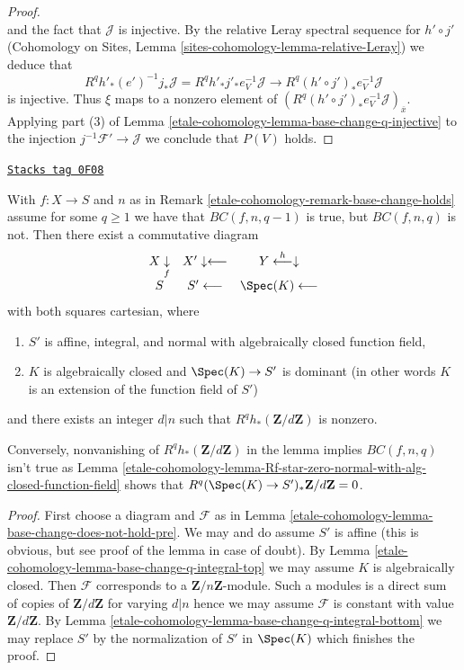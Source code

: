 \begin{proof}
$$$$
and the fact that $\mathcal{J}$ is injective.
By the relative Leray spectral sequence for $h' \circ j'$
(Cohomology on Sites, Lemma \ref{sites-cohomology-lemma-relative-Leray})
we deduce that
$$
R^qh'_*(e')^{-1}j_*\mathcal{J} =
R^qh'_*j'_*e_V^{-1}\mathcal{J}
\longrightarrow
R^q(h' \circ j')_* e_V^{-1}\mathcal{J}
$$
is injective. Thus $\xi$ maps to a nonzero element of
$(R^q(h' \circ j')_* e_V^{-1}\mathcal{J})_{\overline{x}}$.
Applying part (3) of Lemma \ref{etale-cohomology-lemma-base-change-q-injective}
to the injection $j^{-1}\mathcal{F}' \to \mathcal{J}$
we conclude that $P(V)$ holds.
\end{proof}

\begin{lemma}
\label{etale-cohomology-lemma-base-change-does-not-hold}
\href{https://stacks.math.columbia.edu/tag/0F08}{\texttt{Stacks tag 0F08}}

With $f : X \to S$ and $n$ as in Remark \ref{etale-cohomology-remark-base-change-holds}
assume for some $q \geq 1$ we have that
$BC(f, n, q - 1)$ is true, but $BC(f, n, q)$ is not.
Then there exist a commutative diagram
$$
\begin{array}{ccc}X \underset{f}{\downarrow} & X' \downarrow\longleftarrow & Y \overset{h}{\longleftarrow}\downarrow \\ S & S' \longleftarrow & \Spec(K) \longleftarrow\end{array}
$$
with both squares cartesian, where
\begin{enumerate}
\item $S'$ is affine, integral, and normal with algebraically
closed function field,
\item $K$ is algebraically closed and $\Spec(K) \to S'$
is dominant (in other words $K$ is an extension of
the function field of $S'$)
\end{enumerate}
and there exists an integer $d | n$
such that $R^qh_*(\mathbf{Z}/d\mathbf{Z})$ is nonzero.
\end{lemma}

Conversely, nonvanishing of $R^qh_*(\mathbf{Z}/d\mathbf{Z})$
in the lemma implies $BC(f, n, q)$ isn't true as
Lemma \ref{etale-cohomology-lemma-Rf-star-zero-normal-with-alg-closed-function-field}
shows that $R^q(\Spec(K) \to S')_*\mathbf{Z}/d\mathbf{Z} = 0$.

\begin{proof}
First choose a diagram and $\mathcal{F}$ as in
Lemma \ref{etale-cohomology-lemma-base-change-does-not-hold-pre}.
We may and do assume $S'$ is affine (this is obvious, but
see proof of the lemma in case of doubt).
By Lemma \ref{etale-cohomology-lemma-base-change-q-integral-top}
we may assume $K$ is algebraically closed.
Then $\mathcal{F}$ corresponds to a $\mathbf{Z}/n\mathbf{Z}$-module.
Such a modules is a direct sum of copies of $\mathbf{Z}/d\mathbf{Z}$
for varying $d | n$ hence we may assume $\mathcal{F}$ is
constant with value $\mathbf{Z}/d\mathbf{Z}$.
By Lemma \ref{etale-cohomology-lemma-base-change-q-integral-bottom}
we may replace $S'$ by the normalization
of $S'$ in $\Spec(K)$ which finishes the proof.
\end{proof}

